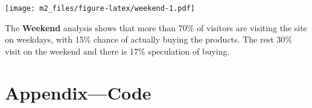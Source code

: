 \documentclass[
]{article}
\newenvironment{Shaded}{\begin{snugshade}}{\end{snugshade}}
\newcommand{\DataTypeTok}[1]{\textcolor[rgb]{0.13,0.29,0.53}{#1}}
\newcommand{\KeywordTok}[1]{\textcolor[rgb]{0.13,0.29,0.53}{\textbf{#1}}}
\newcommand{\NormalTok}[1]{#1}
\newcommand{\OperatorTok}[1]{\textcolor[rgb]{0.81,0.36,0.00}{\textbf{#1}}}
\newcommand{\OtherTok}[1]{\textcolor[rgb]{0.56,0.35,0.01}{#1}}
\newcommand{\StringTok}[1]{\textcolor[rgb]{0.31,0.60,0.02}{#1}}
\begin{document}
\begin{Shaded}
\end{Shaded}

\texttt{[image: m2\_files/figure-latex/weekend-1.pdf]}

The \textbf{Weekend} analysis shows that more than 70\% of visitors are
visiting the site on weekdays, with 15\% chance of actually buying the
products. The rest 30\% visit on the weekend and there is 17\%
speculation of buying.

\hypertarget{appendixcode}{%
\section{Appendix---Code}\label{appendixcode}}
\end{document}
